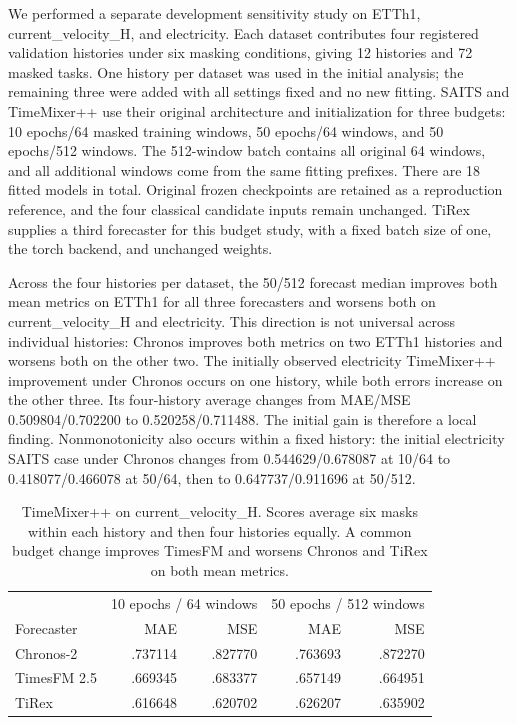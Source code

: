 \documentclass{article}
\begin{document}
We performed a separate development sensitivity study on ETTh1, current\_velocity\_H, and electricity. Each dataset contributes four registered validation histories under six masking conditions, giving 12 histories and 72 masked tasks. One history per dataset was used in the initial analysis; the remaining three were added with all settings fixed and no new fitting. SAITS and TimeMixer++ use their original architecture and initialization for three budgets: 10 epochs/64 masked training windows, 50 epochs/64 windows, and 50 epochs/512 windows. The 512-window batch contains all original 64 windows, and all additional windows come from the same fitting prefixes. There are 18 fitted models in total. Original frozen checkpoints are retained as a reproduction reference, and the four classical candidate inputs remain unchanged. TiRex \citep{auer2025tirex} supplies a third forecaster for this budget study, with a fixed batch size of one, the torch backend, and unchanged weights.

Across the four histories per dataset, the 50/512 forecast median improves both mean metrics on ETTh1 for all three forecasters and worsens both on current\_velocity\_H and electricity. This direction is not universal across individual histories: Chronos improves both metrics on two ETTh1 histories and worsens both on the other two. The initially observed electricity TimeMixer++ improvement under Chronos occurs on one history, while both errors increase on the other three. Its four-history average changes from MAE/MSE 0.509804/0.702200 to 0.520258/0.711488. The initial gain is therefore a local finding. Nonmonotonicity also occurs within a fixed history: the initial electricity SAITS case under Chronos changes from 0.544629/0.678087 at 10/64 to 0.418077/0.466078 at 50/64, then to 0.647737/0.911696 at 50/512.

\begin{table}[t]
\centering\small
\caption{TimeMixer++ on current\_velocity\_H. Scores average six masks within each history and then four histories equally. A common budget change improves TimesFM and worsens Chronos and TiRex on both mean metrics.}
\label{tab:budget-origins}
\begin{tabular}{lrrrr}
\toprule
 & \multicolumn{2}{c}{10 epochs / 64 windows} & \multicolumn{2}{c}{50 epochs / 512 windows}\\
Forecaster & MAE & MSE & MAE & MSE\\
\midrule
Chronos-2 & .737114 & .827770 & .763693 & .872270\\
TimesFM 2.5 & .669345 & .683377 & .657149 & .664951\\
TiRex & .616648 & .620702 & .626207 & .635902\\
\bottomrule
\end{tabular}
\end{table}
\end{document}
